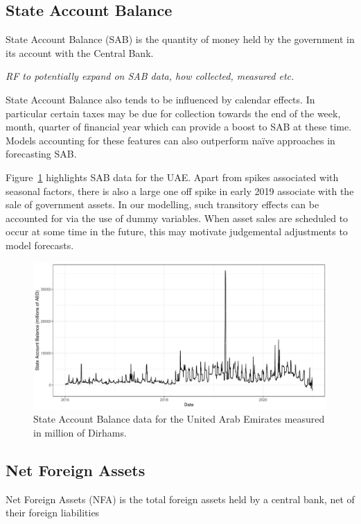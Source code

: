 \documentclass{article}
\begin{document}
\subsection{State Account Balance}

State Account Balance (SAB) is the quantity of money held by the government in its account with the Central Bank. 

\textit{\color{blue} RF to potentially expand on SAB data, how collected, measured etc.}

State Account Balance also tends to be influenced by calendar effects. In particular certain taxes may be due for collection towards the end of the week, month, quarter of financial year which can provide a boost to SAB at these time. Models accounting for these features can also outperform na\"ive approaches in forecasting SAB. 

Figure~\ref{fig:sabdata} highlights SAB data for the UAE. Apart from spikes associated with seasonal factors, there is also a large one off spike in early 2019 associate with the sale of government assets. In our modelling, such transitory effects can be accounted for via the use of dummy variables. When asset sales are scheduled to occur at some time in the future, this may motivate judgemental adjustments to model forecasts.

\begin{figure}[!h]
    \centering
    \includegraphics[scale=0.6]{sabplot}
    \caption{State Account Balance data for the United Arab Emirates measured in million of Dirhams.}
    \label{fig:sabdata}
\end{figure}

\subsection{Net Foreign Assets}

Net Foreign Assets (NFA) is the total foreign assets held by a central bank, net of their foreign liabilities
\end{document}

